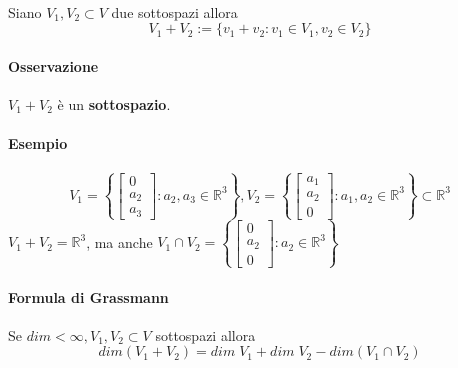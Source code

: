 \documentclass[a4paper, 12pt]{report}
\begin{document}
                \paragraph{}Siano $V_1,V_2 \subset V$ due sottospazi allora
                $$V_1+V_2:=\{v_1+v_2 : v_1 \in V_1, v_2 \in V_2 \}$$
            \paragraph{Osservazione}$V_1+V_2$ è un \textbf{sottospazio}.
            \paragraph{Esempio}
                $$
                V_1=\left \{ 
                \begin{bmatrix}
                    0\\
                    a_2\\
                    a_3
                \end{bmatrix}
                :a_2,a_3 \in \mathbb{R}^3    
                \right \}
                ,V_2=\left \{ 
                \begin{bmatrix}
                    a_1\\
                    a_2\\
                    0
                \end{bmatrix}
                :a_1,a_2 \in \mathbb{R}^3    
                \right \} \subset \mathbb{R}^3
                $$
                $V_1+V_2=\mathbb{R}^3$, ma anche $V_1 \cap V_2=\left \{ 
                    \begin{bmatrix}
                    0\\
                        a_2\\
                        0
                    \end{bmatrix}
                    :a_2 \in \mathbb{R}^3    
                \right \}
                $
            \paragraph{Formula di Grassmann} Se $dim < \infty, V_1,V_2 \subset V$ sottospazi allora
            $$dim(V_1+V_2)=dim \; V_1 + dim \; V_2 - dim(V_1 \cap V_2)$$
\end{document}
